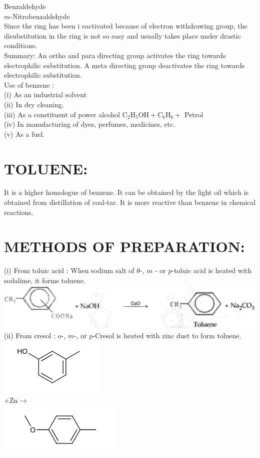 \documentclass[10pt]{article}
\begin{document}
Benzaldehyde\\
$m$-Nitrobenzaldehyde\\
Since the ring has been i eactivated because of electron withdrawing group, the disubstitution in the ring is not so easy and usually takes place under drastic conditions.\\
Summary: An ortho and para directing group activates the ring towards electrophilic substitution. A meta directing group deactivates the ring towards electrophilic substitution.\\
Use of benzene :\\
(i) As an industrial solvent\\
(ii) In dry cleaning.\\
(iii) As a constituent of power alcohol $\mathrm{C}_{2} \mathrm{H}_{5} \mathrm{OH}+\mathrm{C}_{6} \mathrm{H}_{6}+$ Petrol\\
(iv) In manufacturing of dyes, perfumes, medicines, etc.\\
(v) As a fuel.

\section*{TOLUENE:}
It is a higher homologue of benzene. It can be obtained by the light oil which is obtained from distillation of coal-tar. It is more reactive than benzene in chemical reactions.

\section*{METHODS OF PREPARATION:}
(i) From toluic acid : When sodium salt of $\theta$-, $m$ - or $p$-toluic acid is heated with sodalime, it forms toluene.\\
\includegraphics[max width=\textwidth, center]{2025_01_28_8470952b98110cec3aabg-213(2)}\\
(ii) From cresol : $o$-, $m$-, or $p$-Cresol is heated with zinc dust to form toluene.\\
\includegraphics{smile-6bac6e67a9e65d7e162470145e3c4d66e07983a5}\\
$+\mathrm{Zn} \longrightarrow$\\
\includegraphics{smile-0500b1ad297ab0ae7792d539c839f711d7c31167}
\end{document}
